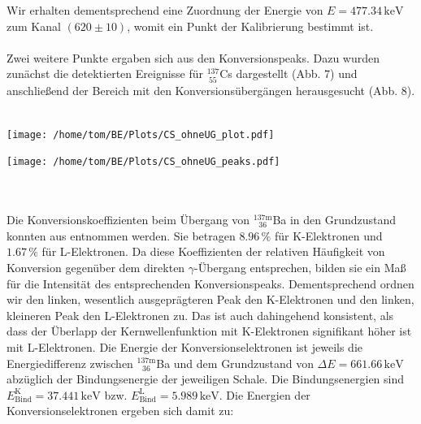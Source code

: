 \documentclass[german,  %
parskip=full,  %
]{scrartcl}
\begin{document}
Wir erhalten dementsprechend eine Zuordnung der Energie von \(E=477.34\,\mathrm{keV}\) zum Kanal \((620\pm 10)\), womit ein Punkt der Kalibrierung bestimmt ist. \\\\
Zwei weitere Punkte ergaben sich aus den Konversionspeaks. Dazu wurden zunächst die detektierten Ereignisse für \(^{137}_{\ 55}\)Cs dargestellt (Abb. 7) und anschließend der Bereich mit den Konversionsübergängen herausgesucht (Abb. 8). \\\\
\begin{minipage}{0.5\textwidth}%
\begin{flushleft}
\texttt{[image: /home/tom/BE/Plots/CS\_ohneUG\_plot.pdf]}
\end{flushleft}
\end{minipage}
\begin{minipage}{0.5\textwidth}%
\begin{flushleft}
\texttt{[image: /home/tom/BE/Plots/CS\_ohneUG\_peaks.pdf]}
\end{flushleft}
\end{minipage} \\\\
Die Konversionskoeffizienten beim Übergang von \(^{137\mathrm{m}}_{\ \ \ 36}\)Ba in den Grundzustand konnten aus \cite{Anleitung} entnommen werden. Sie betragen \(8.96\,\%\) für K-Elektronen und \(1.67\,\%\) für L-Elektronen. Da diese Koeffizienten der relativen Häufigkeit von Konversion gegenüber dem direkten \(\gamma\)-Übergang entsprechen, bilden sie ein Maß für die Intensität des entsprechenden Konversionspeaks. Dementsprechend ordnen wir den linken, wesentlich ausgeprägteren Peak den K-Elektronen und den linken, kleineren Peak den L-Elektronen zu. Das ist auch dahingehend konsistent, als dass der Überlapp der Kernwellenfunktion mit K-Elektronen signifikant höher ist mit L-Elektronen. Die Energie der Konversionselektronen ist jeweils die Energiedifferenz zwischen \(^{137\mathrm{m}}_{\ \ \ 36}\)Ba und dem Grundzustand von \(\Delta E = 661.66\,\mathrm{keV}\) abzüglich der Bindungsenergie der jeweiligen Schale. Die Bindungsenergien sind \(E_{\mathrm{Bind}}^{\mathrm{K}} = 37.441\,\mathrm{keV}\) bzw. \(E_{\mathrm{Bind}}^{\mathrm{L}} = 5.989\,\mathrm{keV}\). Die Energien der Konversionselektronen ergeben sich damit zu:
\end{document}
